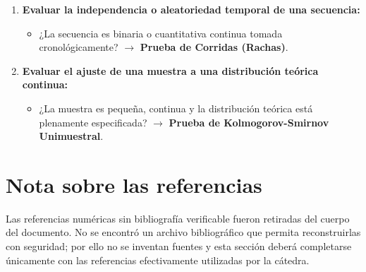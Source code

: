 \documentclass[11pt,a4paper]{article}
\begin{document}
\begin{tcolorbox}[colback=green!5!white,colframe=green!40!black,title=Guía Procedimental para Elección de Método]
\begin{enumerate}
        \item \textbf{Evaluar la independencia o aleatoriedad temporal de una secuencia:}
        \begin{itemize}
            \item ¿La secuencia es binaria o cuantitativa continua tomada cronológicamente? $\rightarrow$ \textbf{Prueba de Corridas (Rachas)}.
        \end{itemize}
        \item \textbf{Evaluar el ajuste de una muestra a una distribución teórica continua:}
        \begin{itemize}
            \item ¿La muestra es pequeña, continua y la distribución teórica está plenamente especificada? $\rightarrow$ \textbf{Prueba de Kolmogorov-Smirnov Unimuestral}.
        \end{itemize}
    \end{enumerate}
\end{tcolorbox}

\section*{Nota sobre las referencias}
Las referencias numéricas sin bibliografía verificable fueron retiradas del cuerpo del documento. No se encontró un archivo bibliográfico que permita reconstruirlas con seguridad; por ello no se inventan fuentes y esta sección deberá completarse únicamente con las referencias efectivamente utilizadas por la cátedra.
\end{document}
